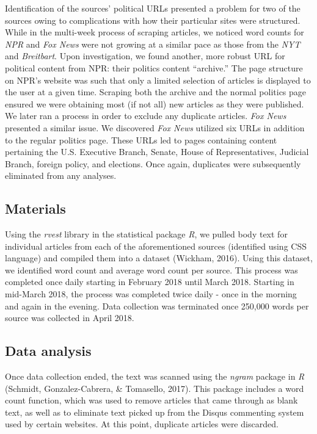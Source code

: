 \documentclass[
  english,
  man,floatsintext]{apa6}
\begin{document}
Identification of the sources' political URLs presented a problem for two of the sources owing to complications with how their particular sites were structured. While in the multi-week process of scraping articles, we noticed word counts for \emph{NPR} and \emph{Fox News} were not growing at a similar pace as those from the \emph{NYT} and \emph{Breitbart}. Upon investigation, we found another, more robust URL for political content from NPR: their politics content ``archive.'' The page structure on NPR's website was such that only a limited selection of articles is displayed to the user at a given time. Scraping both the archive and the normal politics page ensured we were obtaining most (if not all) new articles as they were published. We later ran a process in order to exclude any duplicate articles. \emph{Fox News} presented a similar issue. We discovered \emph{Fox News} utilized six URLs in addition to the regular politics page. These URLs led to pages containing content pertaining the U.S. Executive Branch, Senate, House of Representatives, Judicial Branch, foreign policy, and elections. Once again, duplicates were subsequently eliminated from any analyses.

\hypertarget{materials}{%
\subsection{Materials}\label{materials}}

Using the \emph{rvest} library in the statistical package \emph{R}, we pulled body text for individual articles from each of the aforementioned sources (identified using CSS language) and compiled them into a dataset (Wickham, 2016). Using this dataset, we identified word count and average word count per source. This process was completed once daily starting in February 2018 until March 2018. Starting in mid-March 2018, the process was completed twice daily - once in the morning and again in the evening. Data collection was terminated once 250,000 words per source was collected in April 2018.

\hypertarget{data-analysis}{%
\subsection{Data analysis}\label{data-analysis}}

Once data collection ended, the text was scanned using the \emph{ngram} package in \emph{R} (Schmidt, Gonzalez-Cabrera, \& Tomasello, 2017). This package includes a word count function, which was used to remove articles that came through as blank text, as well as to eliminate text picked up from the Disqus commenting system used by certain websites. At this point, duplicate articles were discarded.
\end{document}
